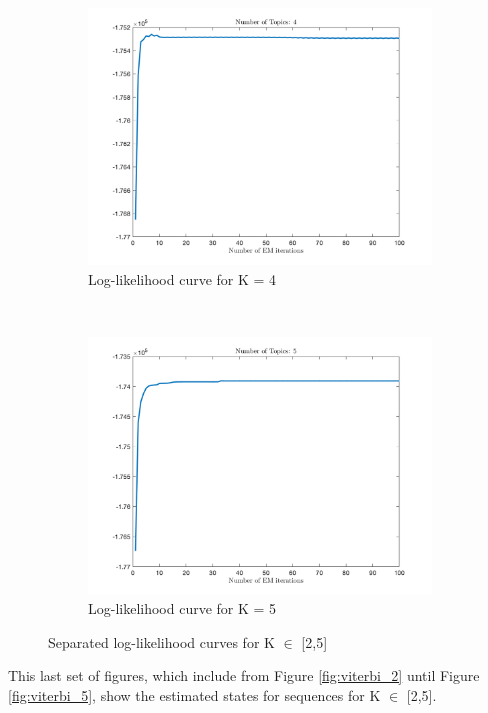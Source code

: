 \documentclass[12pt]{article}
\begin{document}
\begin{figure}[h]
	~	
	\begin{subfigure}{0.45\textwidth}
		\includegraphics[width=\textwidth]{images/Q_4_topics.png}
		\caption{Log-likelihood curve for K = 4}
		\label{fig:Q4}
	\end{subfigure}
	~	
	\begin{subfigure}{0.45\textwidth}
		\includegraphics[width=\textwidth]{images/Q_5_topics.png}
		\caption{Log-likelihood curve for K = 5}
		\label{fig:Q5}
	\end{subfigure}
	\caption{Separated log-likelihood curves for K $\in$ [2,5]}
	\label{fig:Q_all}
\end{figure}

\noindent This last set of figures, which include from Figure \ref{fig:viterbi_2} until Figure \ref{fig:viterbi_5}, show the estimated states for sequences for K $\in$ [2,5].
\end{document}
